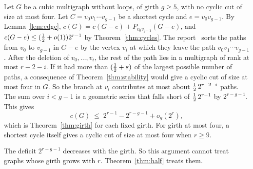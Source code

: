 Let $G$ be a cubic multigraph without loops, of girth $g\ge5$, with no cyclic cut of size at most
four. Let $C=v_0v_1\cdots v_{g-1}$ be a shortest cycle and $e=v_0v_{g-1}$. By
Lemma~\ref{lem:edge}, $c(G)=c(G-e)+P_{v_0v_{g-1}}(G-e)$, and
$c(G-e)\le(\tfrac12+o(1))2^{r-1}$ by Theorem~\ref{thm:cycles}. The report~\cite{S2} sorts the paths
from $v_0$ to $v_{g-1}$ in $G-e$ by the vertex $v_i$ at which they leave the path
$v_0v_1\cdots v_{g-1}$. After the deletion of $v_0,\dots,v_i$, the rest of the path lies in a
multigraph of rank at most $r-2-i$. If it had more than $(\tfrac12+\varepsilon)$ of the largest
possible number of paths, a consequence of Theorem~\ref{thm:stability} would give a cyclic cut of
size at most four in $G$. So the branch at $v_i$ contributes at most about
$\tfrac12\,2^{r-2-i}$ paths. The sum over $i<g-1$ is a geometric series that falls short of
$\tfrac12\,2^{r-1}$ by $2^{r-g-1}$. This gives
\[
  c(G)\;\le\;2^{r-1}-2^{r-g-1}+o_g(2^{r}),
\]
which is Theorem~\ref{thm:girth} for each fixed girth. For girth at most four, a shortest cycle
itself gives a cyclic cut of size at most four when $r\ge9$.

The deficit $2^{r-g-1}$ decreases with the girth. So this argument cannot treat graphs whose girth
grows with $r$. Theorem~\ref{thm:half} treats them.
